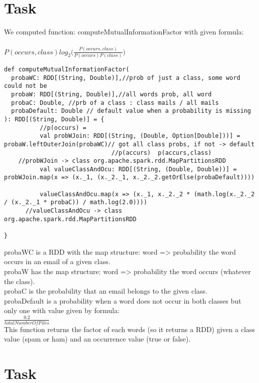 \documentclass[paper=a4, fontsize=11pt]{scrartcl}
\numberwithin{equation}{section}		%
\numberwithin{figure}{section}			%
\numberwithin{table}{section}				%
\begin{document}
\section{Task}
We computed function: computeMutualInformationFactor with given formula: \\ \\
$P(occurs, class)log_2 \Big(\frac{P(occurs, class)}{P(occurs)P(class)}\Big)$ \\
\begin{lstlisting}
def computeMutualInformationFactor(
  probaWC: RDD[(String, Double)],//prob of just a class, some word could not be 
  probaW: RDD[(String, Double)],//all words prob, all word
  probaC: Double, //prb of a class : class mails / all mails
  probaDefault: Double // default value when a probability is missing
): RDD[(String, Double)] = {
          //p(occurs) = 
          val probWJoin: RDD[(String, (Double, Option[Double]))] = probaW.leftOuterJoin(probaWC)// got all class probs, if not -> default
                              //p(accurs)  p(accurs,class) 
	//probWJoin -> class org.apache.spark.rdd.MapPartitionsRDD
          val valueClassAndOcu: RDD[(String, (Double, Double))] = probWJoin.map(x => (x._1, (x._2._1, x._2._2.getOrElse(probaDefault))))
          
          valueClassAndOcu.map(x => (x._1, x._2._2 * (math.log(x._2._2 / (x._2._1 * probaC)) / math.log(2.0))))
	  //valueClassAndOcu -> class org.apache.spark.rdd.MapPartitionsRDD

}
\end{lstlisting}

probaWC is a RDD with the map structure: word => probability the word occurs in an email of a given class. \\
probaW has the map structure: word => probability the word occurs (whatever the class).\\ 
probaC is the probability that an email belongs to the given class. \\
probaDefault is a probability when a word does not occur in both classes but only one with value given by formula: \\
$\frac{0.2}{totalNumberOfFiles}$\\
This function returns the factor of each words (so it returns a RDD) given a class value (spam or ham) and an occurrence value
(true or false).

\section{Task}
\end{document}
